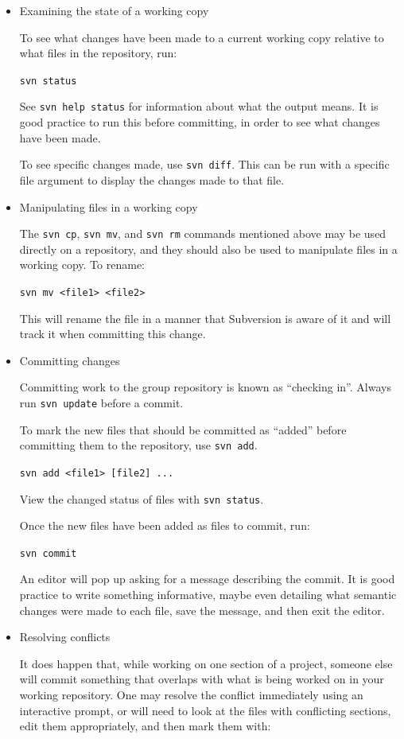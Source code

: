 \begin{itemize}
\item Examining the state of a working copy

To see what changes have been made to a current working copy relative to what files in the repository, run:

\texttt{svn status}

See \texttt{svn help status} for information about what the output means. It is good practice to run this before committing, in order to see what changes have been made.

To see specific changes made, use \texttt{svn diff}. This can be run with a specific file argument to display the changes made to that file.

\item Manipulating files in a working copy

The \texttt{svn cp}, \texttt{svn mv}, and \texttt{svn rm} commands mentioned above may be used directly on a repository, and they should also be used to manipulate files in a working copy. To rename:

\texttt{svn mv <file1> <file2>}

This will rename the file in a manner that Subversion is aware of it and will track it when committing this change.

\item Committing changes

Committing work to the group repository is known as ``checking in''. Always run \texttt{svn update} before a commit.

To mark the new files that should be committed as ``added'' before committing them to the repository, use \texttt{svn add}.

\texttt{svn add <file1> [file2] ...}

View the changed status of files with \texttt{svn status}.

Once the new files have been added as files to commit, run:

\texttt{svn commit}

An editor will pop up asking for a message describing the commit. It is good practice to write something informative, maybe even detailing what semantic changes were made to each file, save the message, and then exit the editor.

\item Resolving conflicts

It does happen that, while working on one section of a project, someone else will commit something that overlaps with what is being worked on in your working repository. One may resolve the conflict immediately using an interactive prompt, or will need to look at the files with conflicting sections, edit them appropriately, and then mark them with:


\end{itemize}
